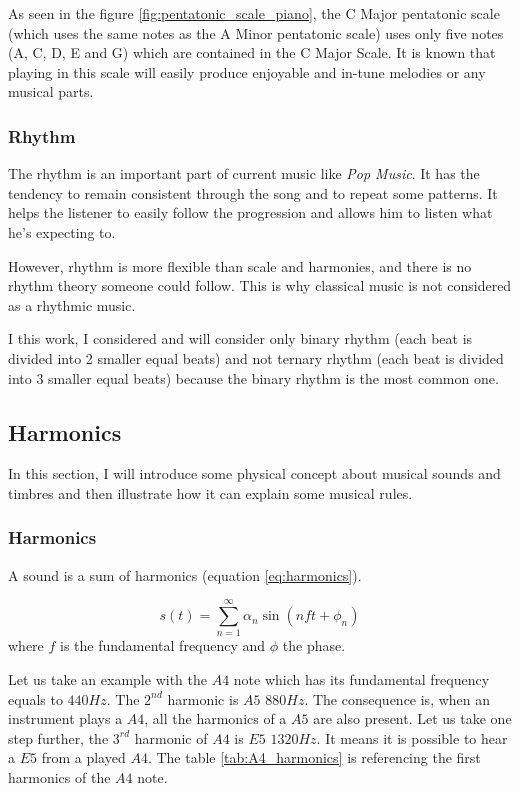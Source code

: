 \documentclass[12pt]{report}
\begin{document}
As seen in the figure \ref{fig:pentatonic_scale_piano}, the C Major pentatonic scale (which uses the same notes as the A Minor pentatonic scale) uses only five notes (A, C, D, E and G) which are contained in the C Major Scale.
It is known that playing in this scale will easily produce enjoyable and in-tune melodies or any musical parts.


\subsubsection{Rhythm}

The rhythm is an important part of current music like \textit{Pop Music}.
It has the tendency to remain consistent through the song and to repeat some patterns.
It helps the listener to easily follow the progression and allows him to listen what he's expecting to.

However, rhythm is more flexible than scale and harmonies, and there is no rhythm theory someone could follow.
This is why classical music is not considered as a rhythmic music.

I this work, I considered and will consider only binary rhythm (each beat is divided into 2 smaller equal beats) and not ternary rhythm (each beat is divided into 3 smaller equal beats) because the binary rhythm is the most common one.


\subsection{Harmonics}
\label{sec:harmonics}

In this section, I will introduce some physical concept about musical sounds and timbres and then illustrate how it can explain some musical rules.

\subsubsection{Harmonics}

A sound is a sum of harmonics (equation \ref{eq:harmonics}).

\begin{equation}
    s(t) = \sum_{n=1}^{\infty} \alpha_{n} \sin(n f t + \phi_{n})
    \label{eq:harmonics}
\end{equation}
where $f$ is the fundamental frequency and $\phi$ the phase.

Let us take an example with the $A4$ note which has its fundamental frequency equals to $440 Hz$.
The $2^{nd}$ harmonic is $A5$ $880Hz$.
The consequence is, when an instrument plays a $A4$, all the harmonics of a $A5$ are also present.
Let us take one step further, the $3^{rd}$ harmonic of $A4$ is $E5$ $1320Hz$.
It means it is possible to hear a $E5$ from a played $A4$.
The table \ref{tab:A4_harmonics} is referencing the first harmonics of the $A4$ note.
\end{document}
